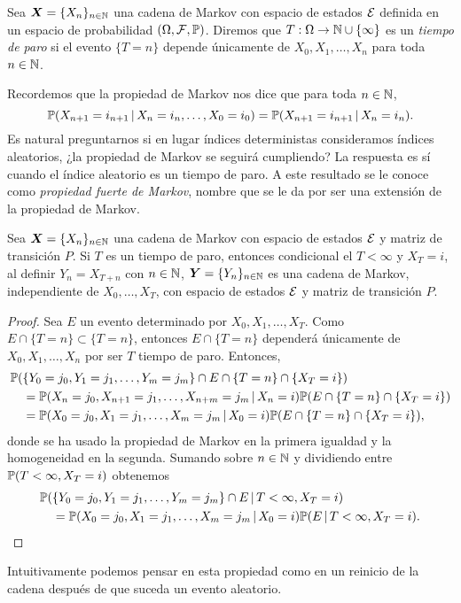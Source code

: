 \begin{definition} \label{def:tiempodeparo}
    Sea $\bm X = \{X_n\}_{n \in \mathbb{N}}$ una cadena de Markov con espacio de estados $\mathcal{E}$ definida en un espacio de probabilidad $(\Omega, \mathcal{F}, \mathbb{P})$. Diremos que $T : \Omega \to \mathbb{N} \cup \{\infty\}$ es un \emph{tiempo de paro} si el evento $\{T = n\}$ depende únicamente de $X_0, X_1, \ldots, X_n$ para toda $n \in \mathbb{N}$.
\end{definition}

Recordemos que la propiedad de Markov nos dice que para toda $n \in \mathbb{N}$,
\[
    \mathbb{P}(X_{n+1} = i_{n+1} \,\vert\, X_n = i_n, \ldots, X_0 = i_0) = \mathbb{P}(X_{n+1} = i_{n+1} \,\vert\, X_n = i_n).
\]
Es natural preguntarnos si en lugar índices deterministas consideramos índices aleatorios, ¿la propiedad de Markov se seguirá cumpliendo? La respuesta es sí cuando el índice aleatorio es un tiempo de paro. A este resultado se le conoce como \emph{propiedad fuerte de Markov}, nombre que se le da por ser una extensión de la propiedad de Markov.

\begin{theorem} \label{teo:markovfuerte}
    Sea $\bm X = \{X_n\}_{n \in \mathbb{N}}$ una cadena de Markov con espacio de estados $\mathcal{E}$ y matriz de transición $P$. Si $T$ es un tiempo de paro, entonces condicional el $T < \infty$ y $X_T = i$, al definir $Y_n = X_{T+n}$ con $n \in \mathbb{N}$, $\bm Y = \{Y_n\}_{n \in \mathbb{N}}$ es una cadena de Markov, independiente de $X_0, \ldots, X_T$, con espacio de estados $\mathcal{E}$ y matriz de transición $P$.
\end{theorem}

\begin{proof}
    Sea $E$ un evento determinado por $X_0, X_1, \ldots, X_T$. Como $E \cap \{T = n\} \subset \{T = n\}$, entonces $E \cap \{T = n\}$ dependerá únicamente de $X_0, X_1, \ldots, X_n$ por ser $T$ tiempo de paro. Entonces, 
    \begin{align*}
        & \mathbb{P}(\{Y_0 = j_0, Y_1 = j_1, \ldots, Y_m = j_m\} \cap E \cap \{T = n\} \cap \{X_T = i\}) \\
        & \quad = \mathbb{P}(X_{n} = j_0, X_{n+1} = j_1, \ldots, X_{n+m} = j_{m} \,\vert\, X_n = i) \mathbb{P}(E \cap \{T = n\} \cap \{X_T = i\}) \\
        & \quad = \mathbb{P}(X_0 = j_0, X_1 = j_1, \ldots, X_m = j_{m} \,\vert\, X_0 = i) \mathbb{P}(E \cap \{T = n\} \cap \{X_T = i\}),
    \end{align*}
    donde se ha usado la propiedad de Markov en la primera igualdad y la homogeneidad en la segunda. Sumando sobre $n \in \mathbb{N}$ y dividiendo entre $\mathbb{P}(T < \infty, X_T = i)$ obtenemos 
    \[
        \begin{split}
            & \mathbb{P}(\{Y_0 = j_0, Y_1 = j_1, \ldots, Y_m = j_m\} \cap E \,\vert\, T < \infty, X_T = i) \\
            & \quad = \mathbb{P}(X_0 = j_0, X_1 = j_1, \ldots, X_m = j_{m} \,\vert\, X_0 = i) \mathbb{P}(E \,\vert\, T < \infty, X_T = i). \qedhere
        \end{split} 
    \]
\end{proof}

Intuitivamente podemos pensar en esta propiedad como en un reinicio de la cadena después de que suceda un evento aleatorio.